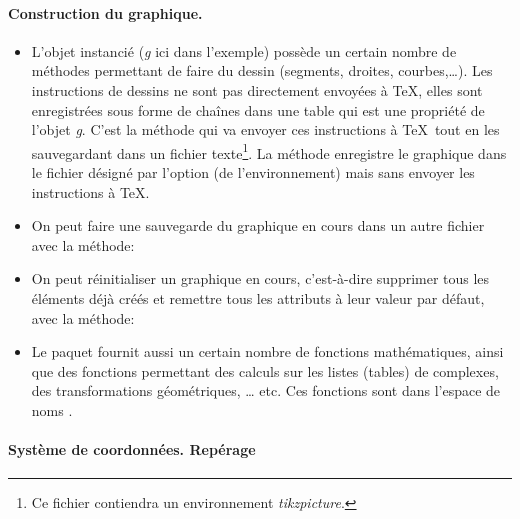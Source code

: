 \paragraph{Construction du graphique.}

\begin{itemize}
    \item L'objet instancié (\emph{g} ici dans l'exemple) possède un certain nombre de méthodes permettant de faire du dessin (segments, droites, courbes,\dots). Les instructions de dessins ne sont pas directement envoyées à \TeX, elles sont enregistrées sous forme de chaînes dans une table qui est une propriété de l'objet \emph{g}. C'est la méthode  qui va envoyer ces instructions à \TeX\ tout en les sauvegardant dans un fichier texte\footnote{Ce fichier contiendra un environnement \emph{tikzpicture}.}. La méthode  enregistre le graphique dans le fichier désigné par l'option (de l'environnement)  mais sans envoyer les instructions à \TeX.
    
    \item On peut faire une sauvegarde du graphique en cours dans un autre fichier avec la méthode: 
    
    \item On peut réinitialiser un graphique en cours, c'est-à-dire supprimer tous les éléments déjà créés et remettre tous les attributs à leur valeur par défaut, avec la méthode: 
    
    \item Le paquet \luadrawenv fournit aussi un certain nombre de fonctions mathématiques, ainsi que des fonctions permettant des calculs sur les listes (tables) de complexes, des transformations géométriques, \ldots{} etc. Ces fonctions sont dans l'espace de noms \luadrawenv.
\end{itemize}


\paragraph{Système de coordonnées. Repérage}

